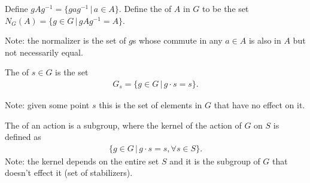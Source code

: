 \documentclass[10pt,a4paper]{report}
\begin{document}
\begin{definition}[Normalizer]Define $gAg^{-1}=\{gag^{-1}\,|\, a \in A\}$.  Define the  of $A$ in $G$ to be the set $N_G(A)=\{g\in G\,|\,gAg^{-1}=A\}$.
\end{definition}
Note: the normalizer is the set of $g$s whose commute in any $a\in A$ is also in $A$ but not necessarily equal.

\begin{definition}[Stabilizer] The  of $s \in G$ is the set 
\begin{align*}
	G_s=\{g\in G\,|\, g\cdot s=s\}.
\end{align*}
\end{definition}
Note: given some point $s$ this is the set of elements in $G$ that have no effect on it.

\begin{definition}[Kernel]The  of an action is a subgroup, where the kernel of the action of $G$ on $S$ is defined as
\begin{align*}
	\{ g\in G\,|\, g\cdot s=s, \forall s \in S\}.
\end{align*}Note: the kernel depends on the entire set $S$ and it is the subgroup of $G$ that doesn't effect it (set of stabilizers).
\end{definition}
\end{document}
